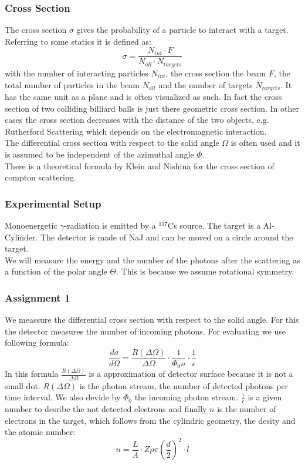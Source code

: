 \newpage

\subsubsection{Cross Section}
The cross section $\sigma$ gives the probability of a particle to interact with a target. Referring to some statics it is defined as:
$$\sigma = \frac{N_{int} \cdot F}{N_{all} \cdot N_{targets}} $$
with the number of interacting particles $N_{int}$, the cross section the beam $F$, the total number of particles in the beam $N_{all}$ and the number of targets $N_{targets}$. It has the same unit as a plane and is often visualized as such. In fact the cross section of two colliding billiard balls is just there geometric cross section. In other cases the cross section decreases with the distance of the two objects, e.g. Rutherford Scattering which depends on the electromagnetic interaction.\\
The differential cross section with respect to the solid angle $\Omega$ is often used and it is assumed to be independent of the azimuthal angle $\Phi$.\\
There is a theoretical formula by Klein and Nishina for the cross section of compton scattering.

\subsubsection{Experimental Setup}
Monoenergetic $\gamma$-radiation is emitted by a $^{137}$Cs source. The target is a Al-Cylinder. The detector is made of NaJ and can be moved on a circle around the target. \\
We will measure the energy and the number of the photons after the scattering as a function of the polar angle $\Theta$. This is because we assume rotational symmetry.

\subsubsection{Assignment 1}
We meassure the differential cross section with respect to the solid angle. For this the detector measures the number of incoming photons. For evaluating we use following formula:
$$\frac{d\sigma}{d\Omega} = \frac{R(\Delta \Omega)}{\Delta \Omega} \cdot \frac{1}{\Phi _0 n} \cdot \frac{1}{\epsilon} $$
In this formula $\frac{R(\Delta \Omega)}{\Delta \Omega}$ is a approximation of detector surface because it is not a small dot. $R(\Delta \Omega)$ is the photon stream, the number of detected photons per time interval. We also devide by $\Phi _0$ the incoming photon stream. $\frac{1}{\epsilon}$ is a given number to desribe the not detected electrons and finally $n$ is the number of electrons in the target, which follows from the cylindric geometry, the desity and the atomic number:
$$n =  \frac{L}{A} \cdot Z \rho \pi (\frac{d}{2})^{2} \cdot l $$

